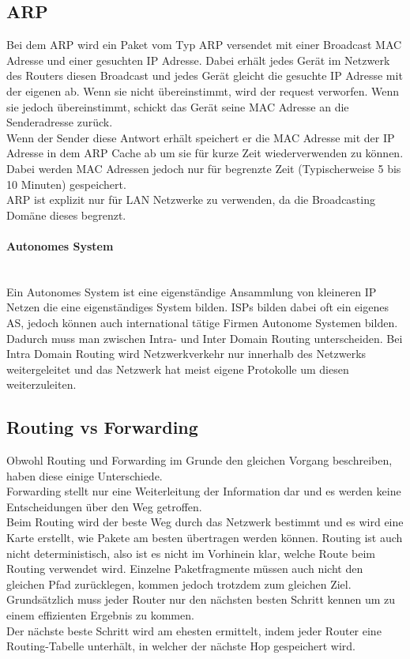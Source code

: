 \documentclass{article}
\newcommand{\paragraphlb}[1]{\paragraph{#1}\mbox{}\\}
\begin{document}
	 \subsection{ARP}
	 Bei dem ARP wird ein Paket vom Typ ARP versendet mit einer Broadcast MAC Adresse und einer gesuchten IP Adresse. Dabei erhält jedes Gerät im Netzwerk des Routers diesen Broadcast und jedes Gerät gleicht die gesuchte IP Adresse mit der eigenen ab. Wenn sie nicht übereinstimmt, wird der request verworfen. Wenn sie jedoch übereinstimmt, schickt das Gerät seine MAC Adresse an die Senderadresse zurück. \\
	 Wenn der Sender diese Antwort erhält speichert er die MAC Adresse mit der IP Adresse in dem ARP Cache ab um sie für kurze Zeit wiederverwenden zu können. Dabei werden MAC Adressen jedoch nur für begrenzte Zeit (Typischerweise 5 bis 10 Minuten) gespeichert. \\
	 ARP ist explizit nur für LAN Netzwerke zu verwenden, da die Broadcasting Domäne dieses begrenzt.
	 \paragraphlb{Autonomes System}
	 Ein Autonomes System ist eine eigenständige Ansammlung von kleineren IP Netzen die eine eigenständiges System bilden. ISPs bilden dabei oft ein eigenes AS, jedoch können auch international tätige Firmen Autonome Systemen bilden. \\
	 Dadurch muss man zwischen Intra- und Inter Domain Routing unterscheiden. Bei Intra Domain Routing wird Netzwerkverkehr nur innerhalb des Netzwerks weitergeleitet und das Netzwerk hat meist eigene Protokolle um diesen weiterzuleiten. 
	 \subsection{Routing vs Forwarding}
	 Obwohl Routing und Forwarding im Grunde den gleichen Vorgang beschreiben, haben diese einige Unterschiede. \\
	 Forwarding stellt nur eine Weiterleitung der Information dar und es werden keine Entscheidungen über den Weg getroffen. \\
	 Beim Routing wird der beste Weg durch das Netzwerk bestimmt und es wird eine Karte erstellt, wie Pakete am besten übertragen werden können. Routing ist auch nicht deterministisch, also ist es nicht im Vorhinein klar, welche Route beim Routing verwendet wird. Einzelne Paketfragmente müssen auch nicht den gleichen Pfad zurücklegen, kommen jedoch trotzdem zum gleichen Ziel. Grundsätzlich muss jeder Router nur den nächsten besten Schritt kennen um zu einem effizienten Ergebnis zu kommen. \\
	 Der nächste beste Schritt wird am ehesten ermittelt, indem jeder Router eine Routing-Tabelle unterhält, in welcher der nächste Hop gespeichert wird. \\
\end{document}

